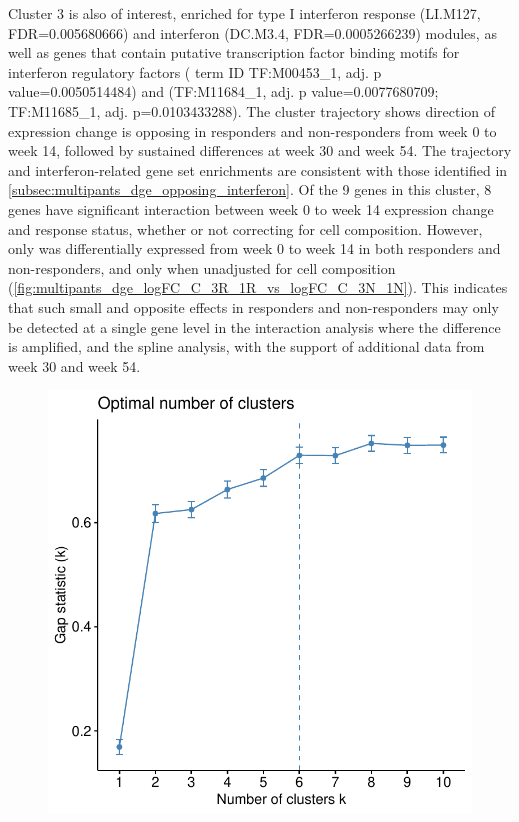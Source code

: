 \begin{outline}
Cluster 3 is also of interest, enriched for type I interferon response (LI.M127, FDR=\num{0.005680666}) and interferon (DC.M3.4, FDR=\num{0.0005266239}) modules,
as well as genes that contain putative transcription factor binding motifs for interferon regulatory factors  ( term ID TF:M00453\_1, adj. p value=\num{0.0050514484}) 
and  (TF:M11684\_1, adj. p value=\num{0.0077680709}; TF:M11685\_1, adj. p=\num{0.0103433288}).
The cluster trajectory shows direction of expression change is opposing in responders and non-responders from week 0 to week 14, followed by sustained differences at week 30 and week 54.
The trajectory and interferon-related gene set enrichments are consistent with those identified in \autoref{subsec:multipants_dge_opposing_interferon}.
Of the 9 genes in this cluster, 8 genes have significant interaction between week 0 to week 14 expression change and response status,
whether or not correcting for cell composition.
However, only  was differentially expressed from week 0 to week 14 in both responders and non-responders,
and only when unadjusted for cell composition (\autoref{fig:multipants_dge_logFC_C_3R_1R_vs_logFC_C_3N_1N}).
This indicates that such small and opposite effects in responders and non-responders may only be detected at a single gene level in the interaction analysis where the difference is amplified,
and the spline analysis, with the support of additional data from week 30 and week 54.


\begin{figure}
    \centering
    \includegraphics[width=1.0\textwidth,page=1]{mainmatter/figures/chapter_04/plot_gene_set_enrichment.spline_fviz_nbclust_gap_stat.pdf}
    \caption{}
    \label{fig:multipants_dge_spline_fviz_nbclust_gap_stat}
\end{figure}


\end{outline}
